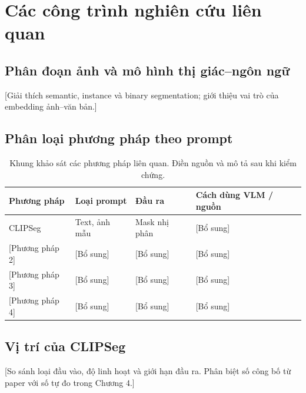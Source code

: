 \chapter{Các công trình nghiên cứu liên quan}
\section{Phân đoạn ảnh và mô hình thị giác--ngôn ngữ}
[Giải thích semantic, instance và binary segmentation; giới thiệu vai trò của embedding ảnh--văn bản.]

\section{Phân loại phương pháp theo prompt}
\begin{table}[H]
\centering
\caption{Khung khảo sát các phương pháp liên quan. Điền nguồn và mô tả sau khi kiểm chứng.}
\label{tab:related}
\begin{tabularx}{\textwidth}{@{}l L L L@{}}
\toprule
Phương pháp & Loại prompt & Đầu ra & Cách dùng VLM / nguồn \\
\midrule
CLIPSeg & Text, ảnh mẫu & Mask nhị phân & [Bổ sung] \\
{[Phương pháp 2]} & [Bổ sung] & [Bổ sung] & [Bổ sung] \\
{[Phương pháp 3]} & [Bổ sung] & [Bổ sung] & [Bổ sung] \\
{[Phương pháp 4]} & [Bổ sung] & [Bổ sung] & [Bổ sung] \\
\bottomrule
\end{tabularx}
\end{table}

\section{Vị trí của CLIPSeg}
[So sánh loại đầu vào, độ linh hoạt và giới hạn đầu ra. Phân biệt số công bố từ paper với số tự đo trong Chương 4.]

